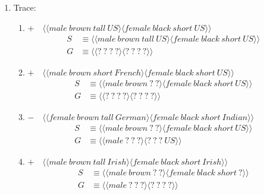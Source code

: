 \documentclass[10pt]{article}
\theoremstyle{definition}
\begin{document}
\begin{enumerate}
    \item Trace:
        \begin{enumerate}
            \item $+\quad\langle\langle male\ brown\ tall\ US\rangle \langle female\
                black\ short\ US\rangle\rangle$
                \begin{align}
                    S &\equiv \langle\langle male\ brown\ tall\ US\rangle
                    \langle female\ black\ short\ US\rangle\rangle\\
                    G &\equiv \langle\langle ?\ ?\ ?\ ?\rangle \langle ?\ ?\ ?\
                    ? \rangle\rangle
                \end{align}
            \item $+\quad\langle\langle male\ brown\ short\ French \rangle \langle female\
                black\ short\ US\rangle\rangle$
                \begin{align}
                    S &\equiv \langle\langle male\ brown\ ?\ ?\rangle
                    \langle female\ black\ short\ US\rangle\rangle\\
                    G &\equiv \langle\langle ?\ ?\ ?\ ?\rangle \langle ?\ ?\ ?\
                    ? \rangle\rangle
                \end{align}
            \item $-\quad\langle\langle female\ brown\ tall\ German\rangle \langle female\
                black\ short\ Indian\rangle\rangle$
                \begin{align}
                    S &\equiv \langle\langle male\ brown\ ?\ ?\rangle
                    \langle female\ black\ short\ US\rangle\rangle\\
                    G &\equiv \langle\langle male\ ?\ ?\ ?\rangle \langle ?\ ?\ ?\
                    US\rangle\rangle
                \end{align}
            \item $+\quad\langle\langle male\ brown\ tall\ Irish\rangle \langle female\
                black\ short\ Irish\rangle\rangle$
                \begin{align}
                    S &\equiv \langle\langle male\ brown\ ?\ ?\rangle
                    \langle female\ black\ short\ ?\rangle\rangle\\
                    G &\equiv \langle\langle male\ ?\ ?\ ?\rangle \langle ?\ ?\ ?\
                    ?\rangle\rangle
                \end{align}
        \end{enumerate}
\end{enumerate}
\end{document}

